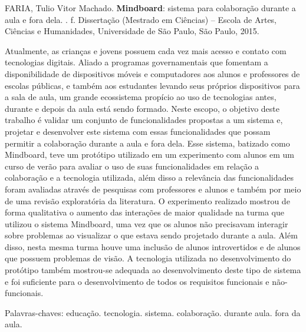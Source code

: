 \documentclass[
	12pt,				%
	oneside,			%
	a4paper,			%
	english,			%
	brazil				%
	]{abntex2ppgsi}
\begin{document}
\setlength{\absparsep}{18pt} %
\begin{resumo}

% 
%
% 
%
\begin{flushleft}
FARIA, Tulio Vitor Machado. \textbf{Mindboard}: sistema para colaboração durante a aula e fora dela. \imprimirdata. \pageref{LastPage} f. Dissertação (Mestrado em Ciências) – Escola de Artes, Ciências e Humanidades, Universidade de São Paulo, São Paulo, 2015.
\end{flushleft}

Atualmente, as crianças e jovens possuem cada vez mais acesso e contato com tecnologias digitais. Aliado a programas governamentais que fomentam a disponibilidade de dispositivos móveis e computadores aos alunos e professores de escolas públicas, e também aos estudantes levando seus próprios dispositivos para a sala de aula, um grande ecossistema propício ao uso de tecnologias antes, durante e depois da aula está sendo formado. Neste escopo, o objetivo deste trabalho é validar um conjunto de funcionalidades propostas a um sistema e, projetar e desenvolver este sistema com essas funcionalidades que possam permitir a colaboração durante a aula e fora dela. Esse sistema, batizado como Mindboard, teve um protótipo utilizado em um experimento com alunos em um curso de verão para avaliar o uso de suas funcionalidades em relação a colaboração e a tecnologia utilizada, além disso a relevância das funcionalidades foram avaliadas através de pesquisas com professores e alunos e também por meio de uma revisão exploratória da literatura. O experimento realizado mostrou de forma qualitativa o aumento das interações de maior qualidade na turma que utilizou o sistema Mindboard, uma vez que os alunos não precisavam interagir sobre problemas ao visualizar o que estava sendo projetado durante a aula. Além disso, nesta mesma turma houve uma inclusão de alunos introvertidos e de alunos que possuem problemas de visão. A tecnologia utilizada no desenvolvimento do protótipo também mostrou-se adequada ao desenvolvimento deste tipo de sistema e foi suficiente para o desenvolvimento de todos os requisitos funcionais e não-funcionais.


Palavras-chaves: educação. tecnologia. sistema. colaboração. durante aula. fora da aula. 

\end{resumo}
\end{document}

